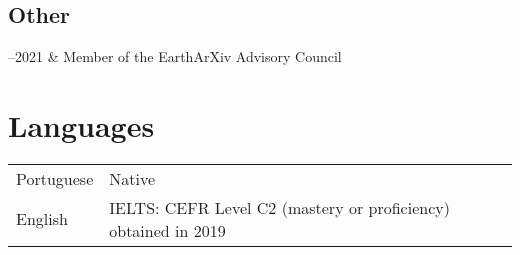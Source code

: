 \documentclass[11pt, a4paper]{article}
\newcommand{\TablePad}{\vspace{-0.4cm}}
\newcommand{\Duration}[2]{\fontsize{10pt}{0}\selectfont #1--#2}
\begin{document}
\subsection{Other}

\begin{EntriesTable}
    \Duration{2019}{2021} & Member of the EarthArXiv Advisory Council
\end{EntriesTable}


\section{Languages}

\TablePad
\begin{tabularx}{\textwidth}{@{}p{} p{}@{}}
    Portuguese & Native
    \\
    English & IELTS: CEFR Level C2 (mastery or proficiency) obtained in 2019
\end{tabularx}
\end{document}

